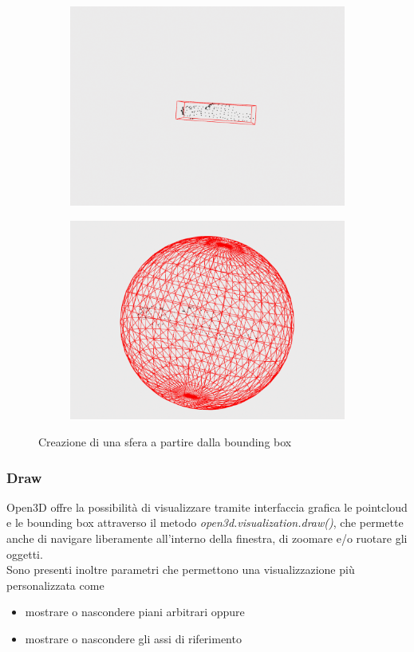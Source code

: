 \documentclass[italian]{article}
\begin{document}
\begin{figure}[H]
	\centering
	\begin{subfigure}{0.45\textwidth}
		\includegraphics[width=\textwidth]{notExpandedBox}
	\end{subfigure}
	\begin{subfigure}{0.45\textwidth}
		\includegraphics[width=\textwidth]{Sphere}
	\end{subfigure}
	\footnotesize
	\caption{Creazione di una sfera a partire dalla bounding box}
\end{figure}
\subsubsection{Draw}
Open3D offre la possibilità di visualizzare tramite interfaccia grafica le pointcloud e le bounding box attraverso il metodo \textit{open3d.visualization.draw()}, che permette anche di navigare liberamente all'interno della finestra, di zoomare e/o ruotare gli oggetti.\\
Sono presenti inoltre parametri che permettono una visualizzazione più personalizzata come
\begin{itemize}
	\item mostrare o nascondere piani arbitrari oppure
	\item mostrare o nascondere gli assi di riferimento
\end{itemize}
\end{document}

